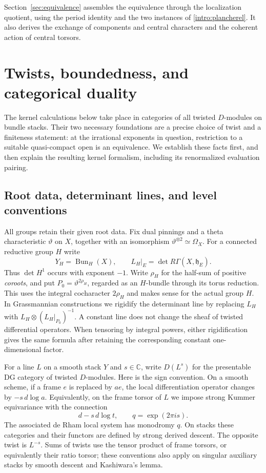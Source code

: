 \documentclass[11pt]{article}
\numberwithin{equation}{section}
\theoremstyle{definition}
\theoremstyle{remark}
\begin{document}
Section~\ref{sec:equivalence} assembles the equivalence through the
localization quotient, using the period identity and the two instances
of \eqref{intro:plancherel}. It also derives the exchange of components
and central characters and the coherent action of central torsors.

\section{Twists, boundedness, and categorical duality}\label{sec:foundations}

The kernel calculations below take place in categories of all twisted
$D$-modules on bundle stacks.  Their two necessary foundations are a precise
choice of twist and a finiteness statement: at the irrational exponents in
question, restriction to a suitable quasi-compact open is an equivalence.
We establish these facts first, and then explain the resulting kernel
formalism, including its renormalized evaluation pairing.

\subsection{Root data, determinant lines, and level conventions}

All groups retain their given root data.  Fix dual pinnings and a theta
characteristic $\vartheta$ on $X$, together with an isomorphism
$\vartheta^{\otimes2}\simeq\Omega_X$.  For a connected reductive group $H$ write
\[
 Y_H=\operatorname{Bun}_H(X),\qquad
 L_H|_E=\det R\Gamma(X,\mathfrak h_E).
\]
Thus $\det H^1$ occurs with exponent $-1$.  Write $\rho_H$ for the half-sum
of positive \emph{coroots}, and put $P_0=\vartheta^{2\rho_H}$, regarded as an
$H$-bundle through its torus reduction.  This uses the integral cocharacter
$2\rho_H$ and makes sense for the actual group $H$.  In Grassmannian
constructions we rigidify the determinant line by replacing $L_H$ with
$L_H\otimes(L_H|_{P_0})^{-1}$.  A constant line does not change the sheaf of
twisted differential operators.  When tensoring by integral powers, either
rigidification gives the same formula after retaining the corresponding
constant one-dimensional factor.

For a line $L$ on a smooth stack $Y$ and $s\in\mathbb C$, write $D(L^s)$ for
the presentable DG category of twisted $D$-modules.  Here is the sign
convention.  On a smooth scheme, if a frame $e$ is replaced by $ae$, the
local differentiation operator changes by $-s\,d\log a$.  Equivalently,
on the frame torsor of $L$ we impose strong Kummer equivariance with the
connection
\begin{equation}\label{foundations:kummer}
 d-s\,d\log t,\qquad q=\exp(2\pi i s).
\end{equation}
The associated de Rham local system has monodromy $q$.  On stacks these
categories and their functors are defined by strong derived descent.
The opposite twist is $L^{-s}$.  Sums of twists use the tensor product of
frame torsors, or equivalently their ratio torsor; these conventions also
apply on singular auxiliary stacks by smooth descent and Kashiwara's lemma.
\end{document}
